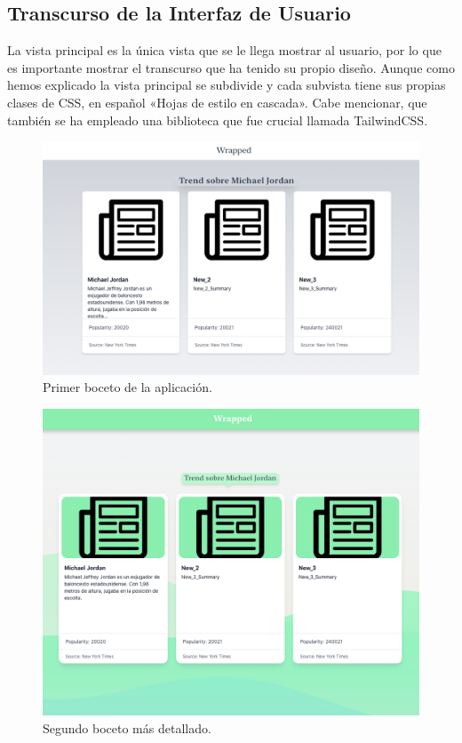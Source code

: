 \subsection{Transcurso de la Interfaz de Usuario}
La vista principal es la única vista que se le llega mostrar al usuario, por lo que es importante mostrar el transcurso que ha tenido su propio diseño. Aunque como hemos explicado la vista principal se subdivide y cada subvista tiene sus propias clases de CSS, en español «Hojas de estilo en cascada». Cabe mencionar, que también se ha empleado una biblioteca que fue crucial llamada TailwindCSS.

\begin{figure}[H]
    \centering
    \myfloatalign
    \includegraphics[width=1\textwidth]{gfx/primer-boceto.png}
    \caption[Primer boceto de la aplicación]{Primer boceto de la aplicación.}\label{gfx:primer-boceto}
\end{figure}

\begin{figure}[H]
    \centering
    \myfloatalign
    \includegraphics[width=1\textwidth]{gfx/segundo-boceto.png}
    \caption[Segundo boceto más detallado]{Segundo boceto más detallado.}\label{gfx:segundo-boceto}
\end{figure}

